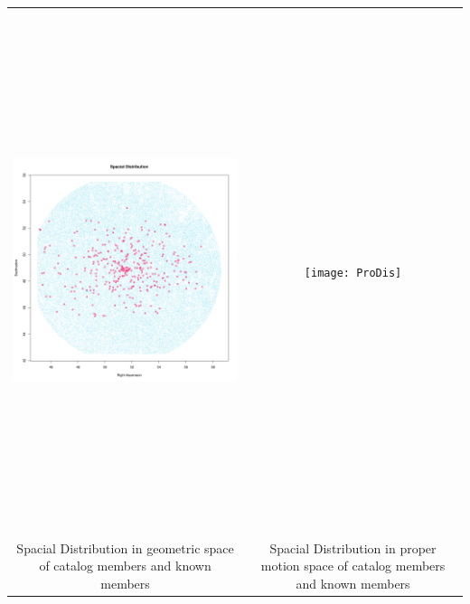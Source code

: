 \documentclass{article}
\begin{document}
\begin{tabular}{@{}c@{} @{}c@{}}
\includegraphics[height=6in,width=6in]{SpaDis}&\texttt{[image: ProDis]}\\
\large Spacial Distribution in geometric space of catalog members and known members&\large Spacial Distribution in proper motion space of catalog members and known members\\

\end{tabular}
\end{document}
